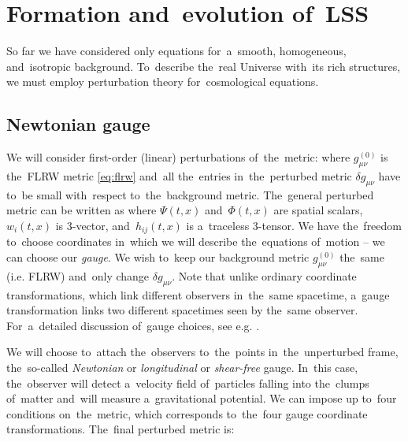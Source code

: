 \section{Formation and~evolution of~LSS}
So far we have considered only equations for~a~smooth, homogeneous, and~isotropic background. To~describe the~real Universe with~its rich structures, we must employ perturbation theory for~cosmological equations.
\subsection{Newtonian gauge}
We will consider first-order (linear) perturbations of~the~metric:
where $g_{\mu\nu}^{(0)}$ is the~FLRW metric \eqref{eq:flrw} and~all the~entries in~the~perturbed metric $\delta g_{\mu\nu}$ have to~be small with~respect to~the~background metric. The~general perturbed metric can be written as
where $\Psi(t,x)$ and~$\Phi(t,x)$ are spatial scalars, $w_i(t,x)$ is 3-vector, and~$h_{ij}(t,x)$ is a~traceless 3-tensor. We have the~freedom to~choose coordinates in~which we will describe the~equations of~motion -- we can choose our \textit{gauge}. We wish to~keep our background metric $g_{\mu\nu}^{(0)}$ the~same (i.e. FLRW) and~only change $\delta g_{\mu\nu}$. Note that unlike ordinary coordinate transformations, which link different observers in~the~same spacetime, a~gauge transformation links two different spacetimes seen by the~same observer. For~a~detailed discussion of~gauge choices, see e.g. \textcite{PhysRevD.40.1804,10.1143/PTPS.78.1,PhysRevD.22.1882}.

We will choose to~attach the~observers to~the~points in~the~unperturbed frame, the~so-called \textit{Newtonian} or \textit{longitudinal} or \textit{shear-free} gauge. In~this case, the~observer will detect a~velocity field of~particles falling into the~clumps of~matter and~will measure a~gravitational potential. We can impose up to~four conditions on~the~metric, which corresponds to~the~four gauge coordinate transformations. The~final perturbed metric is:
